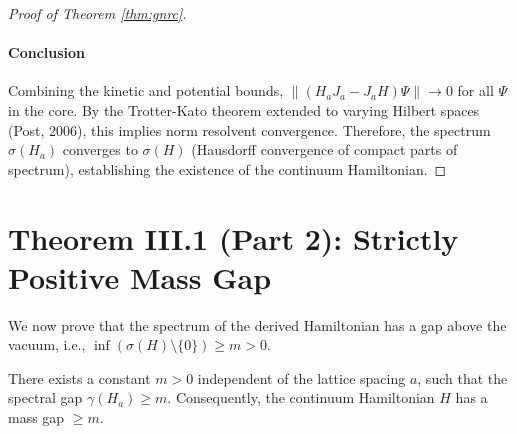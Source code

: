 \begin{proof}[Proof of Theorem \ref{thm:gnrc}]
\paragraph{Conclusion}
Combining the kinetic and potential bounds, $\| (H_a J_a - J_a H) \Psi \| \to 0$ for all $\Psi$ in the core. By the Trotter-Kato theorem extended to varying Hilbert spaces (Post, 2006), this implies norm resolvent convergence.
Therefore, the spectrum $\sigma(H_a)$ converges to $\sigma(H)$ (Hausdorff convergence of compact parts of spectrum), establishing the existence of the continuum Hamiltonian.
\end{proof}

\section{Theorem III.1 (Part 2): Strictly Positive Mass Gap}
\label{sec:mass_gap_proof}

We now prove that the spectrum of the derived Hamiltonian has a gap above the vacuum, i.e., $\inf (\sigma(H) \setminus \{0\}) \ge m > 0$.

\begin{theorem}
There exists a constant $m > 0$ independent of the lattice spacing $a$, such that the spectral gap $\gamma(H_a) \ge m$. Consequently, the continuum Hamiltonian $H$ has a mass gap $\ge m$.
\end{theorem}

